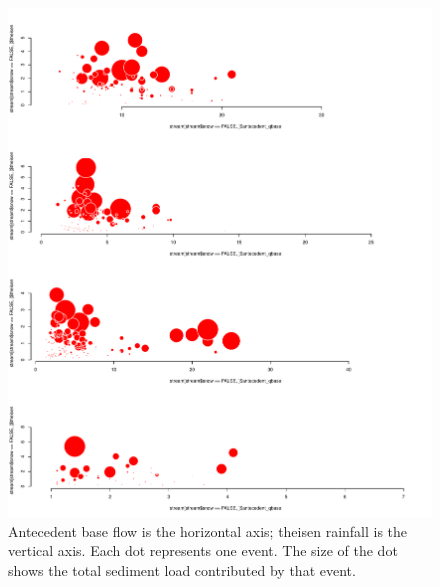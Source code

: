 \documentclass[12pt]{article}
\begin{document}
\begin{figure}
    \begin{center}
\includegraphics{loadings-figure4}
    \end{center}
    \caption{Antecedent base flow is the horizontal axis; theisen rainfall is the vertical axis. Each dot represents one event. The size of the dot shows the total sediment load contributed by that event. \label{bubbles}}
\end{figure}






\end{document}
